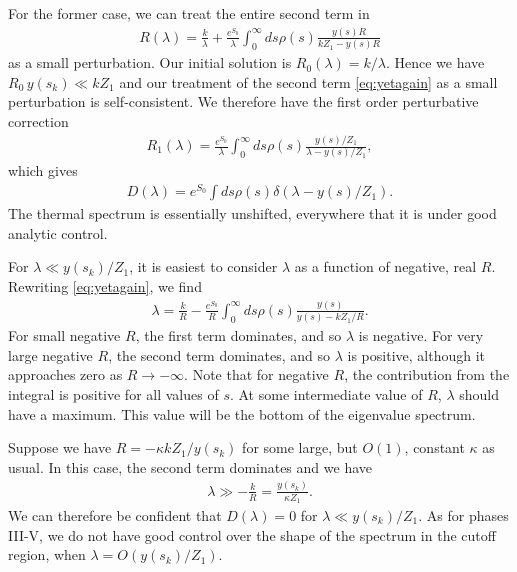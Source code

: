 \documentclass[12pt]{article}
\newcommand{\smax}{s_k}
\numberwithin{equation}{section}
\begin{document}
For the former case, we can treat the entire second term in
\begin{align} \label{eq:yetagain}
R(\lambda) = \frac{k}{\lambda}  +  \frac{e^{S_0}}{\lambda}\int_{0}^\infty ds \rho(s) \frac{y(s) R}{k Z_1 - y(s) R}
\end{align}
as a small perturbation. Our initial solution is $R_0 (\lambda) = k/\lambda$. Hence we have $R_0\, y(\smax) \ll k Z_1$ and our treatment of the second term \eqref{eq:yetagain} as a small perturbation is self-consistent. We therefore have the first order perturbative correction
\begin{align} \label{eq:R1lambda5}
R_1(\lambda) = \frac{e^{S_0}}{\lambda}\int_{0}^\infty ds \rho(s) \frac{y(s)/Z_1}{\lambda - y(s)/Z_1},
\end{align}
which gives
\begin{align}
D(\lambda) = e^{S_0} \int ds \rho(s) \delta( \lambda - y(s)/ Z_1).
\end{align}
The thermal spectrum is essentially unshifted, everywhere that it is under good analytic control.

For $\lambda \ll y(\smax)/Z_1$, it is easiest to consider $\lambda$ as a function of negative, real $R$. Rewriting \eqref{eq:yetagain}, we find
\begin{align}
\lambda = \frac{k}{R} -  \frac{e^{S_0}}{R} \int_{0}^\infty ds \rho(s) \frac{y(s) }{y(s) - k Z_1 / R}.
\end{align}
For small negative $R$, the first term dominates, and so $\lambda$ is negative. For very large negative $R$, the second term dominates, and so $\lambda$ is positive, although it approaches zero as $R \to - \infty$. Note that for negative $R$, the contribution from the integral is positive for all values of $s$. At some intermediate value of $R$, $\lambda$ should have a maximum. This value will be the bottom of the eigenvalue spectrum.

Suppose we have $R = - \kappa k Z_1 / y(\smax)$ for some large, but $O(1)$, constant $\kappa$ as usual. In this case, the second term dominates and we have
\begin{align}
\lambda \gg - \frac{k}{R} = \frac{y(\smax)}{\kappa Z_1}.
\end{align}
We can therefore be confident that $D(\lambda) = 0$ for $\lambda \ll y(\smax)/Z_1$. As for  phases III-V, we do not have good control over the shape of the spectrum in the cutoff region, when $\lambda = O(y(\smax)/Z_1)$.
\end{document}
